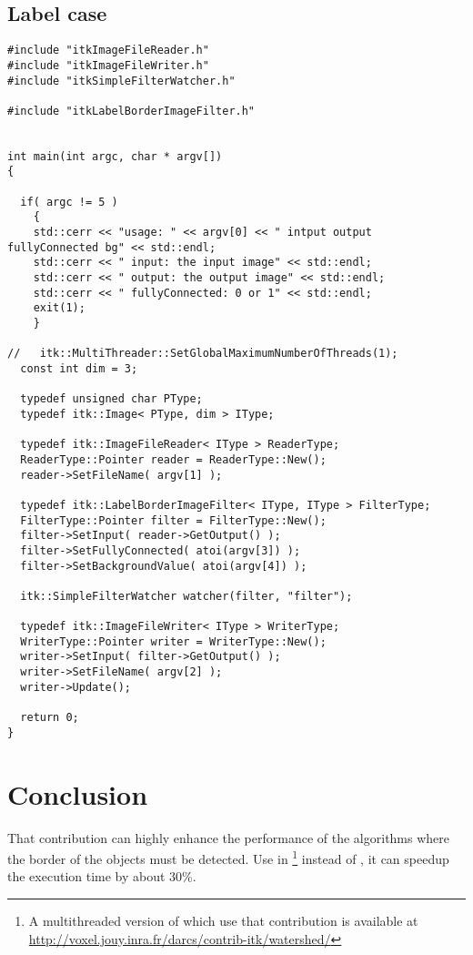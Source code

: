 \documentclass{InsightArticle}
\begin{document}
\subsection{Label case}
\small \begin{verbatim}
#include "itkImageFileReader.h"
#include "itkImageFileWriter.h"
#include "itkSimpleFilterWatcher.h"

#include "itkLabelBorderImageFilter.h"


int main(int argc, char * argv[])
{

  if( argc != 5 )
    {
    std::cerr << "usage: " << argv[0] << " intput output fullyConnected bg" << std::endl;
    std::cerr << " input: the input image" << std::endl;
    std::cerr << " output: the output image" << std::endl;
    std::cerr << " fullyConnected: 0 or 1" << std::endl;
    exit(1);
    }

//   itk::MultiThreader::SetGlobalMaximumNumberOfThreads(1);
  const int dim = 3;
  
  typedef unsigned char PType;
  typedef itk::Image< PType, dim > IType;

  typedef itk::ImageFileReader< IType > ReaderType;
  ReaderType::Pointer reader = ReaderType::New();
  reader->SetFileName( argv[1] );

  typedef itk::LabelBorderImageFilter< IType, IType > FilterType;
  FilterType::Pointer filter = FilterType::New();
  filter->SetInput( reader->GetOutput() );
  filter->SetFullyConnected( atoi(argv[3]) );
  filter->SetBackgroundValue( atoi(argv[4]) );

  itk::SimpleFilterWatcher watcher(filter, "filter");

  typedef itk::ImageFileWriter< IType > WriterType;
  WriterType::Pointer writer = WriterType::New();
  writer->SetInput( filter->GetOutput() );
  writer->SetFileName( argv[2] );
  writer->Update();

  return 0;
}
\end{verbatim} \normalsize

\section{Conclusion}

That contribution can highly enhance the performance of the algorithms where the border of the objects must be detected. Use in \footnote{A multithreaded version of  which use that contribution is available at \url{http://voxel.jouy.inra.fr/darcs/contrib-itk/watershed/}} instead of , it can speedup the execution time by about 30\%.
\end{document}
